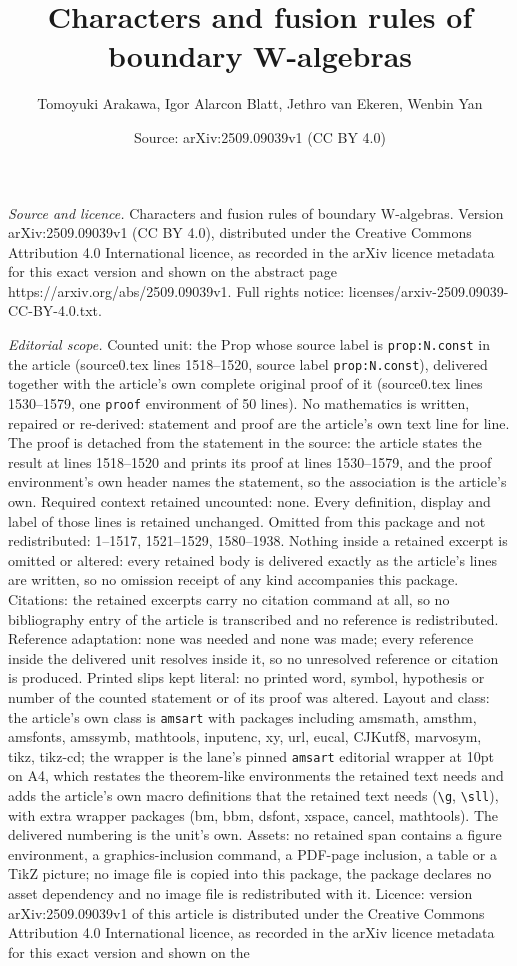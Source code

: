 \documentclass[10pt,a4paper]{amsart}
\title[Characters and fusion rules of boundary W-algebras]{Characters and fusion rules of boundary W-algebras}
\author{Tomoyuki Arakawa, Igor Alarcon Blatt, Jethro van Ekeren, Wenbin Yan}
\date{Source: arXiv:2509.09039v1 (CC BY 4.0)}
\begin{document}
\maketitle

\noindent\emph{Source and licence.} Characters and fusion rules of boundary W-algebras. Version arXiv:2509.09039v1 (CC BY 4.0), distributed under the Creative Commons Attribution 4.0 International licence, as recorded in the arXiv licence metadata for this exact version and shown on the abstract page https://arxiv.org/abs/2509.09039v1. Full rights notice: licenses/arxiv-2509.09039-CC-BY-4.0.txt.\par\smallskip

\noindent\textit{Editorial scope.} Counted unit: the Prop whose source label is \texttt{prop:N.const} in the article (source0.tex lines 1518--1520, source label \texttt{prop:N.const}), delivered together with the article's own complete original proof of it (source0.tex lines 1530--1579, one \texttt{proof} environment of 50 lines). No mathematics is written, repaired or re-derived: statement and proof are the article's own text line for line. The proof is detached from the statement in the source: the article states the result at lines 1518--1520 and prints its proof at lines 1530--1579, and the proof environment's own header names the statement, so the association is the article's own. Required context retained uncounted: none. Every definition, display and label of those lines is retained unchanged. Omitted from this package and not redistributed: 1--1517, 1521--1529, 1580--1938. Nothing inside a retained excerpt is omitted or altered: every retained body is delivered exactly as the article's lines are written, so no omission receipt of any kind accompanies this package. Citations: the retained excerpts carry no citation command at all, so no bibliography entry of the article is transcribed and no reference is redistributed. Reference adaptation: none was needed and none was made; every reference inside the delivered unit resolves inside it, so no unresolved reference or citation is produced. Printed slips kept literal: no printed word, symbol, hypothesis or number of the counted statement or of its proof was altered. Layout and class: the article's own class is \texttt{amsart} with packages including amsmath, amsthm, amsfonts, amssymb, mathtools, inputenc, xy, url, eucal, CJKutf8, marvosym, tikz, tikz-cd; the wrapper is the lane's pinned \texttt{amsart} editorial wrapper at 10pt on A4, which restates the theorem-like environments the retained text needs and adds the article's own macro definitions that the retained text needs (\texttt{\textbackslash g}, \texttt{\textbackslash sll}), with extra wrapper packages (bm, bbm, dsfont, xspace, cancel, mathtools). The delivered numbering is the unit's own. Assets: no retained span contains a figure environment, a graphics-inclusion command, a PDF-page inclusion, a table or a TikZ picture; no image file is copied into this package, the package declares no asset dependency and no image file is redistributed with it. Licence: version arXiv:2509.09039v1 of this article is distributed under the Creative Commons Attribution 4.0 International licence, as recorded in the arXiv licence metadata for this exact version and shown on the 
\end{document}
